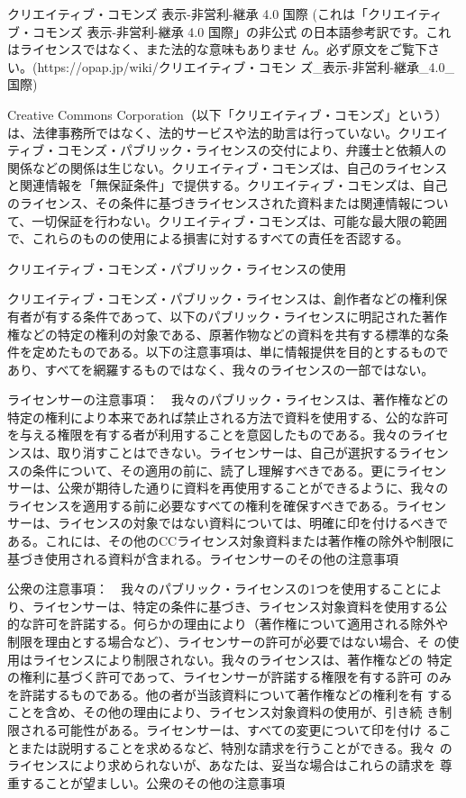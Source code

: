 {\tiny

クリエイティブ・コモンズ 表示-非営利-継承 4.0 国際
(これは「クリエイティブ・コモンズ 表示-非営利-継承 4.0 国際」の非公式
の日本語参考訳です。これはライセンスではなく、また法的な意味もありませ
ん。必ず原文をご覧下さい。(https://opap.jp/wiki/クリエイティブ・コモン
ズ\_表示-非営利-継承\_4.0\_国際)
~\newline

Creative Commons Corporation（以下「クリエイティブ・コモンズ」という）
は、法律事務所ではなく、法的サービスや法的助言は行っていない。クリエイ
ティブ・コモンズ・パブリック・ライセンスの交付により、弁護士と依頼人の
関係などの関係は生じない。クリエイティブ・コモンズは、自己のライセンス
と関連情報を「無保証条件」で提供する。クリエイティブ・コモンズは、自己
のライセンス、その条件に基づきライセンスされた資料または関連情報につい
て、一切保証を行わない。クリエイティブ・コモンズは、可能な最大限の範囲
で、これらのものの使用による損害に対するすべての責任を否認する。

クリエイティブ・コモンズ・パブリック・ライセンスの使用

クリエイティブ・コモンズ・パブリック・ライセンスは、創作者などの権利保
有者が有する条件であって、以下のパブリック・ライセンスに明記された著作
権などの特定の権利の対象である、原著作物などの資料を共有する標準的な条
件を定めたものである。以下の注意事項は、単に情報提供を目的とするもので
あり、すべてを網羅するものではなく、我々のライセンスの一部ではない。


ライセンサーの注意事項：　我々のパブリック・ライセンスは、著作権などの
特定の権利により本来であれば禁止される方法で資料を使用する、公的な許可
を与える権限を有する者が利用することを意図したものである。我々のライセ
ンスは、取り消すことはできない。ライセンサーは、自己が選択するライセン
スの条件について、その適用の前に、読了し理解すべきである。更にライセン
サーは、公衆が期待した通りに資料を再使用することができるように、我々の
ライセンスを適用する前に必要なすべての権利を確保すべきである。ライセン
サーは、ライセンスの対象ではない資料については、明確に印を付けるべきで
ある。これには、その他のCCライセンス対象資料または著作権の除外や制限に
基づき使用される資料が含まれる。ライセンサーのその他の注意事項


公衆の注意事項：　我々のパブリック・ライセンスの1つを使用することによ
り、ライセンサーは、特定の条件に基づき、ライセンス対象資料を使用する公
的な許可を許諾する。何らかの理由により（著作権について適用される除外や
  制限を理由とする場合など）、ライセンサーの許可が必要ではない場合、そ
の使用はライセンスにより制限されない。我々のライセンスは、著作権などの
特定の権利に基づく許可であって、ライセンサーが許諾する権限を有する許可
のみを許諾するものである。他の者が当該資料について著作権などの権利を有
することを含め、その他の理由により、ライセンス対象資料の使用が、引き続
き制限される可能性がある。ライセンサーは、すべての変更について印を付け
ることまたは説明することを求めるなど、特別な請求を行うことができる。我々
のライセンスにより求められないが、あなたは、妥当な場合はこれらの請求を
尊重することが望ましい。公衆のその他の注意事項

}
